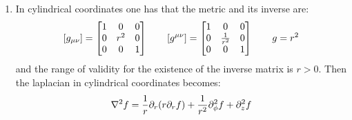 \documentclass[11pt, oneside]{article}
\begin{document}
\begin{enumerate}
\item In cylindrical coordinates one has that the metric and its inverse are:
\[
	\qty[g_{\mu\nu}] = 
	\begin{bmatrix} 
	1 & 0 & 0 \\
	0 & r^2 & 0 \\
	0 & 0 & 1
	\end{bmatrix}
	\qquad 
	\qty[g^{\mu\nu}] = 
	\begin{bmatrix} 
	1 & 0 & 0 \\
	0 & \frac{1}{r^2} & 0 \\
	0 & 0 & 1
	\end{bmatrix}
	\qquad
	g = r^2
\]
and the range of validity for the existence of the inverse matrix is $r>0$. Then the laplacian in cylindrical coordinates becomes:
\[
	\laplacian f = \frac{1}{r} \partial_r \qty( r \partial_r f) + \frac{1}{r^2} \partial_\phi^2 f + \partial_z^2 f
\] 

\end{enumerate}
\end{document}
